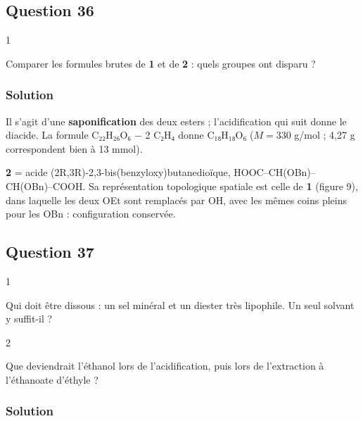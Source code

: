 \documentclass[11pt,a4paper]{article}
\begin{document}
\hypertarget{question-36}{%
\subsection{Question 36}\label{question-36}}

\begin{indication}{1}

Comparer les formules brutes de \textbf{1} et de \textbf{2} : quels groupes ont disparu ?

\end{indication}

\hypertarget{solution-35}{%
\subsubsection{Solution}\label{solution-35}}

Il s'agit d'une \textbf{saponification} des deux esters ; l'acidification qui suit donne le diacide. La formule C₂₂H₂₆O₆ − 2 C₂H₄ donne C₁₈H₁₈O₆ (\(M=330\) g/mol ; 4,27 g correspondent bien à 13 mmol).

\textbf{2} = acide (2R,3R)-\allowbreak{}2,3-\allowbreak{}bis(benzyloxy)butanedioïque, HOOC--\allowbreak{}CH(OBn)--\allowbreak{}CH(OBn)--\allowbreak{}COOH. Sa représentation topologique spatiale est celle de \textbf{1} (figure 9), dans laquelle les deux OEt sont remplacés par OH, avec les mêmes coins pleins pour les OBn : configuration conservée.

\hypertarget{question-37}{%
\subsection{Question 37}\label{question-37}}

\begin{indication}{1}

Qui doit être dissous : un sel minéral et un diester très lipophile. Un seul solvant y suffit-il ?

\end{indication}

\begin{indication}{2}

Que deviendrait l'éthanol lors de l'acidification, puis lors de l'extraction à l'éthanoate d'éthyle ?

\end{indication}

\hypertarget{solution-36}{%
\subsubsection{Solution}\label{solution-36}}
\end{document}
